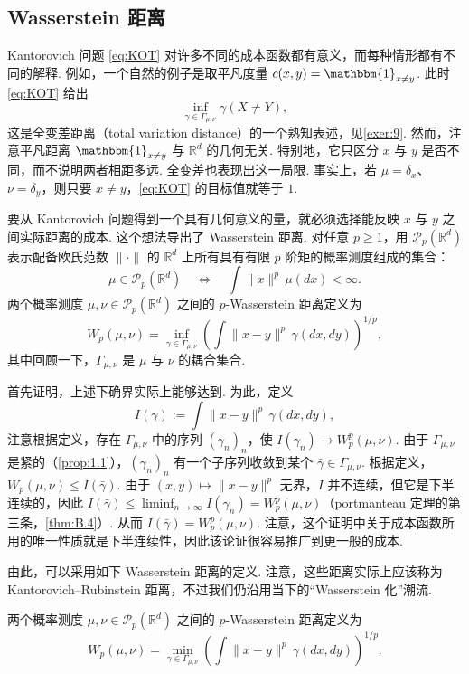\subsection{Wasserstein 距离}\label{sec:1.2}

Kantorovich 问题 \eqref{eq:KOT} 对许多不同的成本函数都有意义，而每种情形都有不同的解释. 例如，一个自然的例子是取平凡度量 $c(x,y)=\mathbbm{1}_{x\ne y}$. 此时 \eqref{eq:KOT} 给出
$$
\inf_{\gamma\in\Gamma_{\mu,\nu}}\gamma(X\ne Y),
$$
这是全变差距离（total variation distance）的一个熟知表述，见\autoref{exer:9}. 然而，注意平凡距离 $\mathbbm{1}_{x\ne y}$ 与 $\mathbb R^d$ 的几何无关. 特别地，它只区分 $x$ 与 $y$ 是否不同，而不说明两者相距多远. 全变差也表现出这一局限. 事实上，若 $\mu=\delta_x$、$\nu=\delta_y$，则只要 $x\ne y$，\eqref{eq:KOT} 的目标值就等于 $1$.

要从 Kantorovich 问题得到一个具有几何意义的量，就必须选择能反映 $x$ 与 $y$ 之间实际距离的成本. 这个想法导出了 Wasserstein 距离. 对任意 $p\ge1$，用 $\mathcal P_p(\mathbb R^d)$ 表示配备欧氏范数 $\lVert\cdot\rVert$ 的 $\mathbb R^d$ 上所有具有有限 $p$ 阶矩的概率测度组成的集合：
$$
\mu\in\mathcal P_p(\mathbb R^d)
\quad\Longleftrightarrow\quad
\int\lVert x\rVert^p\,\mu(dx)<\infty.
$$
两个概率测度 $\mu,\nu\in\mathcal P_p(\mathbb R^d)$ 之间的 $p$-Wasserstein 距离定义为
$$
W_p(\mu,\nu)=\inf_{\gamma\in\Gamma_{\mu,\nu}}
\left(\int\lVert x-y\rVert^p\,\gamma(dx,dy)\right)^{1/p},
$$
其中回顾一下，$\Gamma_{\mu,\nu}$ 是 $\mu$ 与 $\nu$ 的耦合集合.

首先证明，上述下确界实际上能够达到. 为此，定义
$$
I(\gamma):=\int\lVert x-y\rVert^p\,\gamma(dx,dy),
$$
注意根据定义，存在 $\Gamma_{\mu,\nu}$ 中的序列 $(\gamma_n)_n$，使 $I(\gamma_n)\to W_p^p(\mu,\nu)$. 由于 $\Gamma_{\mu,\nu}$ 是紧的（\autoref{prop:1.1}），$(\gamma_n)_n$ 有一个子序列收敛到某个 $\bar\gamma\in\Gamma_{\mu,\nu}$. 根据定义，$W_p(\mu,\nu)\le I(\bar\gamma)$. 由于 $(x,y)\mapsto\lVert x-y\rVert^p$ 无界，$I$ 并不连续，但它是下半连续的，因此 $I(\bar\gamma)\le\liminf_{n\to\infty}I(\gamma_n)=W_p^p(\mu,\nu)$（portmanteau 定理的第三条，\autoref{thm:B.4}）. 从而 $I(\bar\gamma)=W_p^p(\mu,\nu)$. 注意，这个证明中关于成本函数所用的唯一性质就是下半连续性，因此该论证很容易推广到更一般的成本.

由此，可以采用如下 Wasserstein 距离的定义. 注意，这些距离实际上应该称为 Kantorovich--Rubinstein 距离，不过我们仍沿用当下的“Wasserstein 化”潮流.

\begin{definition}\label{def:1.2}
两个概率测度 $\mu,\nu\in\mathcal P_p(\mathbb R^d)$ 之间的 $p$-Wasserstein 距离定义为
$$
W_p(\mu,\nu)=\min_{\gamma\in\Gamma_{\mu,\nu}}
\left(\int\lVert x-y\rVert^p\,\gamma(dx,dy)\right)^{1/p}.
$$
\end{definition}

